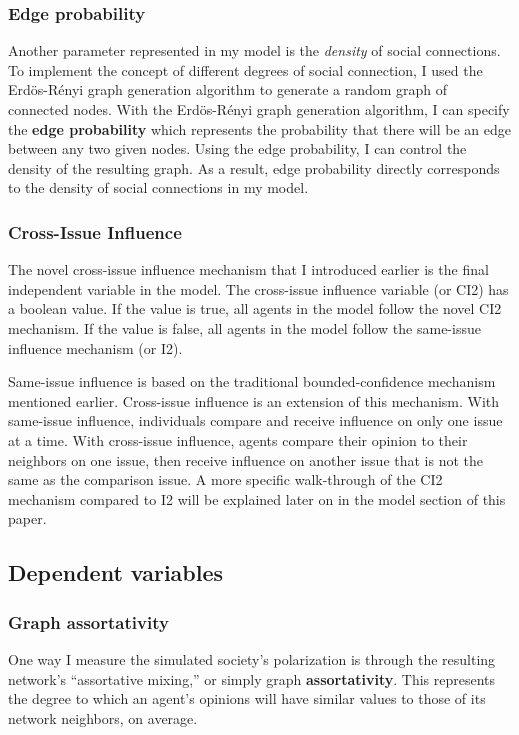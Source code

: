 \subsubsection{Edge probability}

Another parameter represented in my model is the \textit{density} of social
connections. To implement the concept of different degrees of social
connection, I used the Erd\"{o}s-R\'{e}nyi graph generation algorithm to
generate a random graph of connected nodes. With the Erd\"{o}s-R\'{e}nyi graph
generation algorithm, I can specify the \textbf{edge probability} which represents the
probability that there will be an edge between any two given nodes. Using the
edge probability, I can control the density of the resulting graph. As a
result, edge probability directly corresponds to the density of social
connections in my model.    

\subsubsection{Cross-Issue Influence}
The novel cross-issue influence mechanism that I introduced earlier is the final independent variable in the model. The cross-issue influence variable (or CI2) has a boolean value. If the value is true, all agents in the model follow the novel CI2 mechanism. If the value is false, all agents in the model follow the same-issue influence mechanism (or I2).

Same-issue influence is based on the traditional bounded-confidence mechanism mentioned earlier. Cross-issue influence is an extension of this mechanism. With same-issue influence, individuals compare and receive influence on only one issue at a time. With cross-issue influence, agents compare their opinion to their neighbors on one issue, then receive influence on another issue that is not the same as the comparison issue. A more specific walk-through of the CI2 mechanism compared to I2 will be explained later on in the model section of this paper. 

\subsection{Dependent variables}

\subsubsection{Graph assortativity}

One way I measure the simulated society's polarization is through the
resulting network's ``assortative mixing,'' or simply graph
\textbf{assortativity}. This represents the degree to which an agent's opinions
will have similar values to those of its network neighbors, on average.

